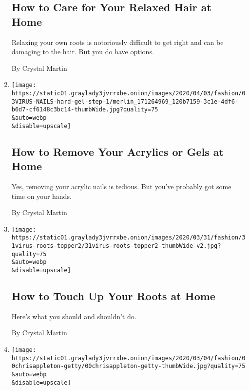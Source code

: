 \begin{enumerate}
  \hypertarget{how-to-care-for-your-relaxed-hair-at-home}{%
  \subsection{How to Care for Your Relaxed Hair at
  Home}\label{how-to-care-for-your-relaxed-hair-at-home}}

  Relaxing your own roots is notoriously difficult to get right and can
  be damaging to the hair. But you do have options.

  By Crystal Martin
\item
  \href{/2020/04/03/style/how-to-remove-your-acrylics-or-gels-at-home.html}{}

  \texttt{[image: https://static01.graylady3jvrrxbe.onion/images/2020/04/03/fashion/03VIRUS-NAILS-hard-gel-step-1/merlin\_171264969\_120b7159-3c1e-4df6-b6d7-cf6148c3bc14-thumbWide.jpg?quality=75\\\&auto=webp\\\&disable=upscale]}

  \hypertarget{how-to-remove-your-acrylics-or-gels-at-home}{%
  \subsection{How to Remove Your Acrylics or Gels at
  Home}\label{how-to-remove-your-acrylics-or-gels-at-home}}

  Yes, removing your acrylic nails is tedious. But you've probably got
  some time on your hands.

  By Crystal Martin
\item
  \href{/2020/03/31/style/how-to-touch-up-your-roots-at-home.html}{}

  \texttt{[image: https://static01.graylady3jvrrxbe.onion/images/2020/03/31/fashion/31virus-roots-topper2/31virus-roots-topper2-thumbWide-v2.jpg?quality=75\\\&auto=webp\\\&disable=upscale]}

  \hypertarget{how-to-touch-up-your-roots-at-home}{%
  \subsection{How to Touch Up Your Roots at
  Home}\label{how-to-touch-up-your-roots-at-home}}

  Here's what you should and shouldn't do.

  By Crystal Martin
\item
  \href{/2020/02/22/style/chris-appleton-hair-jennifer-lopez-the-man-who-creates-memorable-red-carpet-moments-.html}{}

  \texttt{[image: https://static01.graylady3jvrrxbe.onion/images/2020/03/04/fashion/00chrisappleton-getty/00chrisappleton-getty-thumbWide.jpg?quality=75\\\&auto=webp\\\&disable=upscale]}


\end{enumerate}
